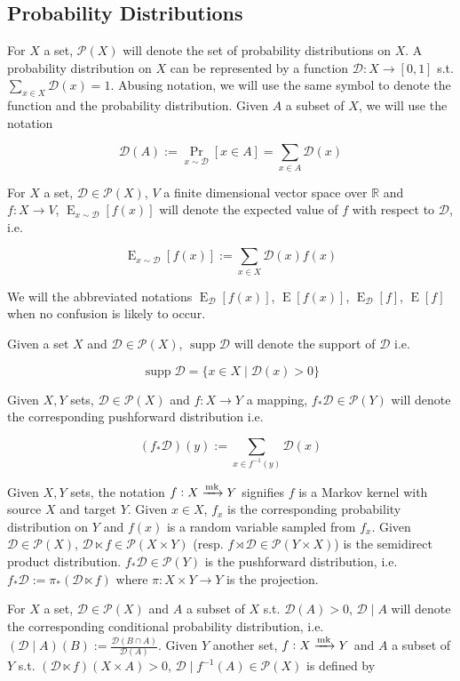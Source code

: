 \documentclass[11pt]{article}
\numberwithin{equation}{section}
\theoremstyle{definition}
\theoremstyle{plain}
\DeclareMathOperator{\Supp}{supp}
\DeclareMathOperator{\Prb}{Pr}
\DeclareMathOperator{\E}{E}
\newcommand{\Reals}{\mathbb{R}}
\newcommand{\Dist}{\mathcal{D}}
\newcommand{\Markov}{\xrightarrow{\textnormal{mk}}}
\begin{document}
\subsection{Probability Distributions}
\label{subsec:notation__prob}

For ${X}$ a set, ${\mathcal{P}(X)}$ will denote the set of probability distributions on ${X}$. A probability distribution on $X$ can be represented by a function $\Dist: X \rightarrow [0,1]$ s.t. $\sum_{x \in X} \Dist(x) = 1$. Abusing notation, we will use the same symbol to denote the function and the probability distribution. Given ${A}$ a subset of ${X}$, we will use the notation

\[\Dist(A):=\Prb_{x \sim \Dist}[x \in A] = \sum_{x \in A} \Dist(x)\]

For $X$ a set, $\Dist \in \mathcal{P}(X)$, $V$ a finite dimensional vector space over $\Reals$ and $f: X \rightarrow V$, $\E_{x \sim \Dist}[f(x)]$ will denote the expected value of $f$ with respect to $\Dist$, i.e. 

\[\E_{x \sim \Dist}[f(x)] := \sum_{x \in X} \Dist(x) f(x)\]

We will the abbreviated notations $\E_\Dist[f(x)]$, $\E[f(x)]$, $\E_\Dist[f]$, $\E[f]$ when no confusion is likely to occur.

Given a set $X$ and $\Dist \in \mathcal{P}(X)$, $\Supp \Dist$ will denote the support of $\Dist$ i.e.

\[\Supp \Dist = \{x \in X \mid \Dist(x) > 0\}\]

Given $X,Y$ sets, $\Dist \in \mathcal{P}(X)$ and $f: X \rightarrow Y$ a mapping, $f_*\Dist \in \mathcal{P}(Y)$ will denote the corresponding pushforward distribution i.e.

\[(f_*\Dist)(y):= \sum_{x \in f^{-1}(y)} \Dist(x)\]

Given $X,Y$ sets, the notation $f: X \xrightarrow{\textnormal{mk}} Y$ signifies $f$ is a Markov kernel with source $X$ and target $Y$. Given $x \in X$, $f_x$ is the corresponding probability distribution on $Y$ and $f(x)$ is a random variable sampled from $f_x$. Given $\Dist \in \mathcal{P}(X)$, $\Dist \ltimes f \in \mathcal{P}(X \times Y)$ (resp. $f \rtimes \Dist \in \mathcal{P}(Y \times X)$) is the semidirect product distribution. $f_*\Dist \in \mathcal{P}(Y)$ is the pushforward distribution, i.e. $f_*\Dist:=\pi_*(\Dist \ltimes f)$ where $\pi: X \times Y \rightarrow Y$ is the projection.

For $X$ a set, $\Dist \in \mathcal{P}(X)$ and $A$ a subset of $X$ s.t. ${\Dist(A) > 0}$, $\Dist \mid A$ will denote the corresponding conditional probability distribution, i.e. $(\Dist \mid A)(B):=\frac{\Dist(B \cap A)}{\Dist(A)}$. Given $Y$ another set, $f: X \Markov Y$ and $A$ a subset of $Y$ s.t. $(\Dist \ltimes f)(X \times A) > 0$, $\Dist \mid f^{-1}(A) \in \mathcal{P}(X)$ is defined by 
\end{document}
